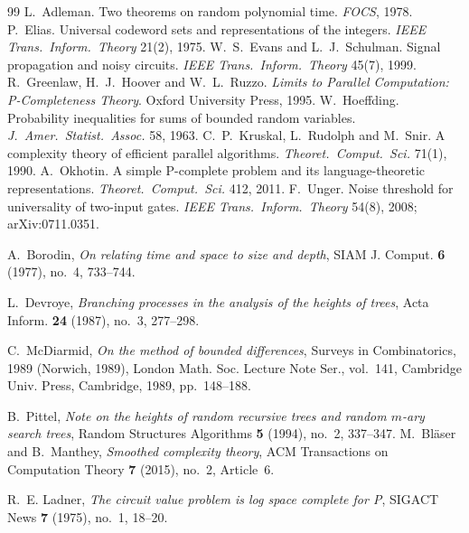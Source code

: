 \documentclass[11pt]{amsart}
\theoremstyle{definition}
\theoremstyle{remark}
\begin{document}
\begin{thebibliography}{99}
 L.~Adleman. Two theorems on random polynomial time. \emph{FOCS}, 1978.
 P.~Elias. Universal codeword sets and representations of the integers.
\emph{IEEE Trans.\ Inform.\ Theory} 21(2), 1975.
 W.~S.~Evans and L.~J.~Schulman. Signal propagation and noisy circuits.
\emph{IEEE Trans.\ Inform.\ Theory} 45(7), 1999.
 R.~Greenlaw, H.~J.~Hoover and W.~L.~Ruzzo. \emph{Limits to Parallel Computation:
P-Completeness Theory}. Oxford University Press, 1995.
 W.~Hoeffding. Probability inequalities for sums of bounded random variables.
\emph{J.\ Amer.\ Statist.\ Assoc.} 58, 1963.
 C.~P.~Kruskal, L.~Rudolph and M.~Snir. A complexity theory of efficient parallel
algorithms. \emph{Theoret.\ Comput.\ Sci.} 71(1), 1990.
 A.~Okhotin. A simple P-complete problem and its language-theoretic
representations. \emph{Theoret.\ Comput.\ Sci.} 412, 2011.
 F.~Unger. Noise threshold for universality of two-input gates.
\emph{IEEE Trans.\ Inform.\ Theory} 54(8), 2008; arXiv:0711.0351.

A.~Borodin, \emph{On relating time and space to size and depth}, SIAM J.
Comput. \textbf{6} (1977), no.~4, 733--744.

L.~Devroye, \emph{Branching processes in the analysis of the heights of
trees}, Acta Inform. \textbf{24} (1987), no.~3, 277--298.

C.~McDiarmid, \emph{On the method of bounded differences}, Surveys in
Combinatorics, 1989 (Norwich, 1989), London Math. Soc. Lecture Note Ser.,
vol.~141, Cambridge Univ. Press, Cambridge, 1989, pp.~148--188.

B.~Pittel, \emph{Note on the heights of random recursive trees and random
$m$-ary search trees}, Random Structures Algorithms \textbf{5} (1994), no.~2,
337--347.
M.~Bl\"aser and B.~Manthey, \emph{Smoothed complexity theory}, ACM
Transactions on Computation Theory \textbf{7} (2015), no.~2, Article~6.

R.~E. Ladner, \emph{The circuit value problem is log space complete for
{P}}, SIGACT News \textbf{7} (1975), no.~1, 18--20.


\end{thebibliography}
\end{document}
